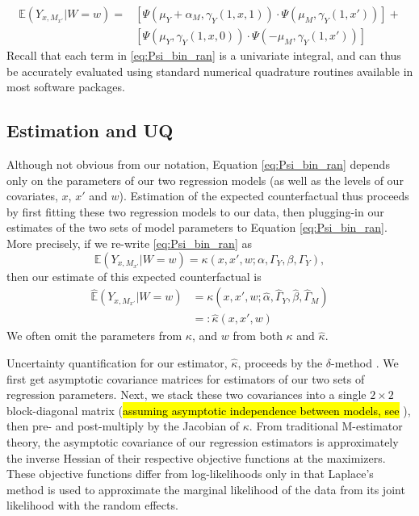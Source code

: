 \documentclass{article}
\newcommand{\bE}{\mathbb{E}}
\begin{document}
%
\begin{align}
    \bE (Y_{x, M_{x'}} | W=w) = & \left[  \Psi(\mu_Y + \alpha_M, \gamma_Y(1, x, 1)) \cdot \Psi(\mu_M , \gamma_Y(1, x')) \right] + \label{eq:Psi_bin_ran}\\
    & \left[ \Psi(\mu_Y, \gamma_Y(1, x, 0)) \cdot \Psi(- \mu_M , \gamma_Y(1, x')) \right] \nonumber
\end{align}
%
Recall that each term in \eqref{eq:Psi_bin_ran} is a univariate integral, and can thus be accurately evaluated using standard numerical quadrature routines available in most software packages.

\subsection{Estimation and UQ}
\label{sec:CF_UQ}

Although not obvious from our notation, Equation \eqref{eq:Psi_bin_ran} depends only on the parameters of our two regression models (as well as the levels of our covariates, $x$, $x'$ and $w$). Estimation of the expected counterfactual thus proceeds by first fitting these two regression models to our data, then plugging-in our estimates of the two sets of model parameters to Equation \eqref{eq:Psi_bin_ran}. More precisely, if we re-write \eqref{eq:Psi_bin_ran} as
%
\begin{equation}
    \bE (Y_{x, M_{x'}} | W=w) = \kappa(x, x', w; \alpha, \Gamma_Y, \beta, \Gamma_Y) \label{eq:kappa},
\end{equation}
%
then our estimate of this expected counterfactual is
\begin{align}
    \hat{\bE} (Y_{x, M_{x'}} | W=w) &= \kappa(x, x', w; \hat{\alpha}, \hat{\Gamma}_Y, \hat{\beta}, \hat{\Gamma}_M) \label{eq:kappa_hat}\\
    &=: \hat{\kappa}(x, x', w)
\end{align}
%
We often omit the parameters from $\kappa$, and $w$ from both $\kappa$ and $\hat{\kappa}$. 

Uncertainty quantification for our estimator, $\hat{\kappa}$, proceeds by the $\delta$-method \citep[see, e.g.,][]{vdV98}. We first get asymptotic covariance matrices for estimators of our two sets of regression parameters. Next, we stack these two covariances into a single $2\times 2$ block-diagonal matrix (\hl{assuming asymptotic independence between models, see} \citealp{Bau06}), then pre- and post-multiply by the Jacobian of $\kappa$. From traditional M-estimator theory, the asymptotic covariance of our regression estimators is approximately the inverse Hessian of their respective objective functions at the maximizers. These objective functions differ from log-likelihoods only in that Laplace's method is used to approximate the marginal likelihood of the data from its joint likelihood with the random effects.
\end{document}
